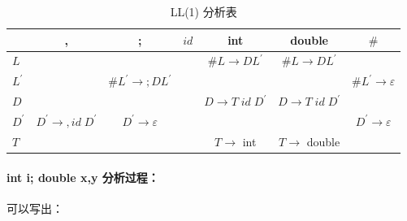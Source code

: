 \begin{table}[htbp]
\centering
\renewcommand{\arraystretch}{1.2} %
\setlength{\tabcolsep}{10pt}      %
\caption{LL(1) 分析表}
\label{tab:LL1}
\begin{tabularx}{\textwidth}{>{\centering\arraybackslash}Xcccccc}
\toprule
 & , & ; & $id$ & int & double & $\#$ \\
\midrule
$L$ &  &  &  & $\#L \rightarrow DL^{\prime}$ & $\#L \rightarrow DL^{\prime}$ & \\
\rowcolor[gray]{.9} %
$L^{\prime}$ &  & $\#L^{\prime} \rightarrow ;DL^{\prime}$ &  &  &  & $\#L^{\prime} \rightarrow \varepsilon$\\
$D$ &  &  &  & $D \rightarrow T\;id\;D^\prime$ & $D \rightarrow T\;id\;D^\prime$ & \\
\rowcolor[gray]{.9}
$D^{\prime}$ & $D^{\prime} \rightarrow,id\;D^{\prime}$ & $D^{\prime} \rightarrow \varepsilon$ &  &  &  & $D^{\prime} \rightarrow \varepsilon$\\
$T$ &  &  &  & $T \rightarrow$ int & $T \rightarrow$ double & \\
\bottomrule
\end{tabularx}
\end{table}

\paragraph{int i; double x,y 分析过程：} 可以写出：


